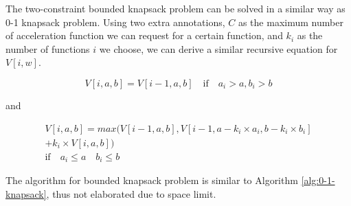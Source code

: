 
The two-constraint bounded knapsack problem can be solved in a similar
way as 0-1 knapsack problem. Using two extra annotations, $C$ as the
maximum number of acceleration function we can request for a certain
function, and $k_i$ as the number of functions $i$ we choose, we can
derive a similar recursive equation for $V[i, w]$.

\begin{equation}
V[i, a, b] = V[i-1, a, b] \quad \text{if} \quad a_i > a, b_i > b
\end{equation}

and

\begin{equation}
	\begin{array}{c}
		V[i, a, b] = max(V[i-1, a, b], V[i-1, a - k_i\times a_i, b - k_i\times b_i] \\
		+ k_i\times V[i, a, b])\\
		\text{if} \quad a_i \leq a \quad b_i \leq b
	\end{array}
\end{equation}

The algorithm for bounded knapsack problem is similar to Algorithm
\ref{alg:0-1-knapsack}, thus not elaborated due to space limit.
